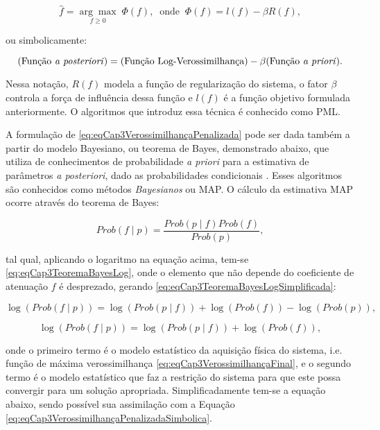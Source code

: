 {{\begin{equation}
\hat{f} = \underset{f\geq 0}{\arg\max} \; \Phi(f), \;\; \text{onde} \;\; \Phi(f) = l(f) - \beta R(f),
\label{eq:eqCap3VerossimilhançaPenalizada}
\end{equation}

\noindent ou simbolicamente:

\begin{equation}
(\text{Função \textit{a posteriori}}) = (\text{Função Log-Verossimilhança}) - \beta (\text{Função \textit{a priori}}).
\label{eq:eqCap3VerossimilhançaPenalizadaSimbolica}
\end{equation}

Nessa notação, $R(f)$ modela a função de regularização do sistema, o fator $\beta$ controla a força de influência dessa função e $l(f)$ é a função objetivo formulada anteriormente. O algoritmos que introduz essa técnica é conhecido como \ac{PML}. 

A formulação de \eqref{eq:eqCap3VerossimilhançaPenalizada} pode ser dada também a partir do modelo Bayesiano, ou teorema de Bayes, demonstrado abaixo, que utiliza de conhecimentos de probabilidade \textit{a priori} para a estimativa de parâmetros \textit{a posteriori}, dado as probabilidades condicionais \cite[p. 144]{zeng2010medical}. Esses algoritmos são conhecidos como métodos \textit{Bayesianos} ou \ac{MAP}. O cálculo da estimativa \acs{MAP} ocorre através do teorema de Bayes:

\begin{equation}
Prob(f \mid p) = \dfrac{Prob(p \mid f) Prob(f)}{Prob(p)},
\label{eq:eqCap3TeoremaBayes}
\end{equation}  

\noindent tal qual,  aplicando o logaritmo na equação acima, tem-se \eqref{eq:eqCap3TeoremaBayesLog}, onde o elemento que não depende do coeficiente de atenuação $f$ é desprezado, gerando \eqref{eq:eqCap3TeoremaBayesLogSimplificada}:

\begin{equation}
\log(Prob(f \mid p)) = \log(Prob(p \mid f)) + \log(Prob(f)) - \log(Prob(p)),
\label{eq:eqCap3TeoremaBayesLog}
\end{equation}

\begin{equation}
\log(Prob(f \mid p)) = \log(Prob(p \mid f)) + \log(Prob(f)),
\label{eq:eqCap3TeoremaBayesLogSimplificada}
\end{equation}

\noindent onde o primeiro termo é o modelo estatístico da aquisição física do sistema, i.e. função de máxima verossimilhança \eqref{eq:eqCap3VerossimilhançaFinal}, e o segundo termo é o modelo estatístico que faz a restrição do sistema para que este possa convergir para um solução apropriada. Simplificadamente tem-se a equação abaixo, sendo possível sua assimilação com a Equação \ref{eq:eqCap3VerossimilhançaPenalizadaSimbolica}.

}}
